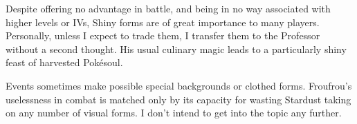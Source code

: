 Despite offering no advantage in battle, and being in no way associated with
  higher levels or IVs, Shiny forms are of great importance to many players.
Personally, unless I expect to trade them, I transfer them to the Professor
  without a second thought.
His usual culinary magic leads to a particularly shiny feast of harvested Pokésoul.

Events sometimes make possible special backgrounds or clothed forms.
Froufrou's uselessness in combat is matched only by its
  capacity for wasting Stardust taking on any number of visual forms.
I don't intend to get into the topic any further.
